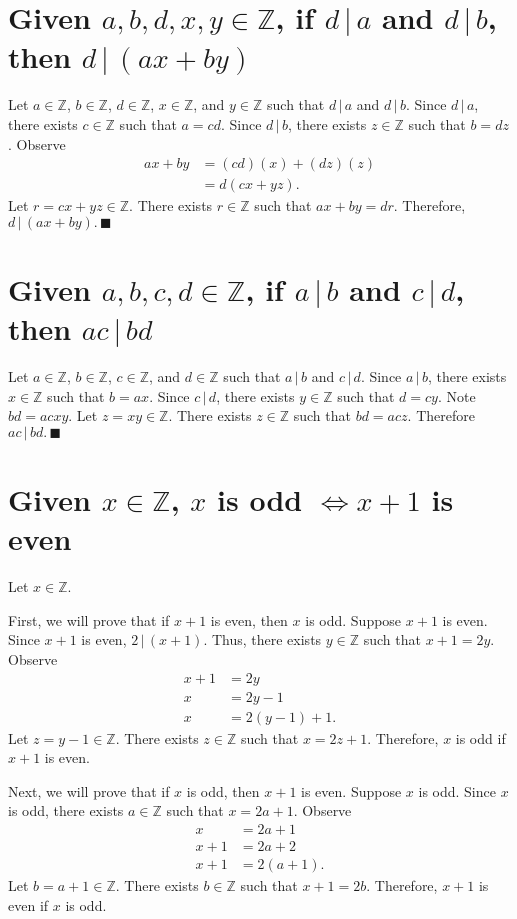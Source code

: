 \documentclass[12pt]{article}
\begin{document}
\section{Given $a,b,d,x,y\in\mathbb{Z}$, if $d\,|\,a$ and $d\,|\,b$, then $d\,|\,(ax+by)$}
Let $a\in\mathbb{Z}$, $b\in\mathbb{Z}$, $d\in\mathbb{Z}$, $x\in\mathbb{Z}$, and $y\in\mathbb{Z}$ such that $d\,|\,a$ and $d\,|\,b$. Since $d\,|\,a$, there exists $c\in\mathbb{Z}$ such that $a=cd$. Since $d\,|\,b$, there exists $z\in\mathbb{Z}$ such that $b=dz$. Observe
\begin{align*}
ax+by
&=(cd)(x)+(dz)(z)\\
&=d(cx+yz).
\end{align*}
Let $r=cx+yz\in\mathbb{Z}$. There exists $r\in\mathbb{Z}$ such that $ax+by=dr$. Therefore, $d\,|\,(ax+by).\,\blacksquare$
\section{Given $a,b,c,d\in\mathbb{Z}$, if $a\,|\,b$ and $c\,|\,d$, then $ac\,|\,bd$}
Let $a\in\mathbb{Z}$, $b\in\mathbb{Z}$, $c\in\mathbb{Z}$, and $d\in\mathbb{Z}$ such that $a\,|\,b$ and $c\,|\,d$. Since $a\,|\,b$, there exists $x\in\mathbb{Z}$ such that $b=ax$. Since $c\,|\,d$, there exists $y\in\mathbb{Z}$ such that $d=cy$. Note $bd=acxy$. Let $z=xy\in\mathbb{Z}$. There exists $z\in\mathbb{Z}$ such that $bd=acz$. Therefore $ac\,|\,bd.\,\blacksquare$
\section{Given $x\in\mathbb{Z}$, $x$ is odd $\iff x+1$ is even}
Let $x\in\mathbb{Z}$.

First, we will prove that if $x+1$ is even, then $x$ is odd. Suppose $x+1$ is even. Since $x+1$ is even, $2\,|\,(x+1)$. Thus, there exists $y\in\mathbb{Z}$ such that $x+1=2y$. Observe
\begin{align*}
x+1&=2y\\
x&=2y-1\\
x&=2(y-1)+1.
\end{align*}
Let $z=y-1\in\mathbb{Z}$. There exists $z\in\mathbb{Z}$ such that $x=2z+1$. Therefore, $x$ is odd if $x+1$ is even.

Next, we will prove that if $x$ is odd, then $x+1$ is even. Suppose $x$ is odd. Since $x$ is odd, there exists $a\in\mathbb{Z}$ such that $x=2a+1$. Observe
\begin{align*}
x&=2a+1\\
x+1&=2a+2\\
x+1&=2(a+1).
\end{align*}
Let $b=a+1\in\mathbb{Z}$. There exists $b\in\mathbb{Z}$ such that $x+1=2b$. Therefore, $x+1$ is even if $x$ is odd.
\end{document}
